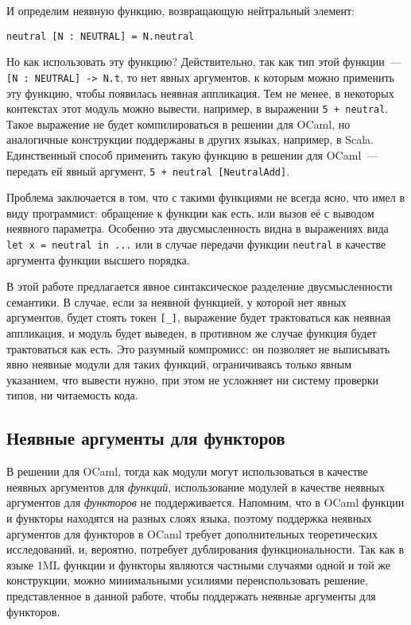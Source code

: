 \documentclass[../diploma.tex]{subfiles}
\begin{document}
И определим неявную функцию, возвращающую нейтральный элемент:

\begin{verbatim}
neutral [N : NEUTRAL] = N.neutral
\end{verbatim}

Но как использовать эту функцию? Действительно, так как тип этой функции~--- \texttt{[N : NEUTRAL] -> N.t}, то нет явных аргументов, к которым можно применить эту функцию, чтобы появилась неявная аппликация. Тем не менее, в некоторых контекстах этот модуль можно вывести, например, в выражении \texttt{5 + neutral}. Такое выражение не будет компилироваться в решении для OCaml, но аналогичные конструкции поддержаны в других языках, например, в Scala. Единственный способ применить такую функцию в решении для OCaml~--- передать ей явный аргумент, \texttt{5 + neutral [NeutralAdd]}.

Проблема заключается в том, что с такими функциями не всегда ясно, что имел в виду программист: обращение к функции как есть, или вызов её с выводом неявного параметра. Особенно эта двусмысленность видна в выражениях вида \texttt{let x = neutral in ...} или в случае передачи функции \texttt{neutral} в качестве аргумента функции высшего порядка. 

В этой работе предлагается явное синтаксическое разделение двусмысленности семантики. В случае, если за неявной функцией, у которой нет явных аргументов, будет стоять токен \texttt{[_]}, выражение будет трактоваться как неявная аппликация, и модуль будет выведен, в противном же случае функция будет трактоваться как есть. Это разумный компромисс: он позволяет не выписывать явно неявные модули для таких функций, ограничиваясь только явным указанием, что вывести нужно, при этом не усложняет ни систему проверки типов, ни читаемость кода.

\subsection{Неявные аргументы для функторов}

В решении для OCaml, тогда как модули могут использоваться в качестве неявных аргументов для \textit{функций}, использование модулей в качестве неявных аргументов для \textit{функторов} не поддерживается. Напомним, что в OCaml функции и функторы находятся на разных слоях языка, поэтому поддержка неявных аргументов для функторов в OCaml требует дополнительных теоретических исследований, и, вероятно, потребует дублирования функциональности. Так как в языке 1ML функции и функторы являются частными случаями одной и той же конструкции, можно минимальными усилиями переиспользовать решение, представленное в данной работе, чтобы поддержать неявные аргументы для функторов.
\end{document}
